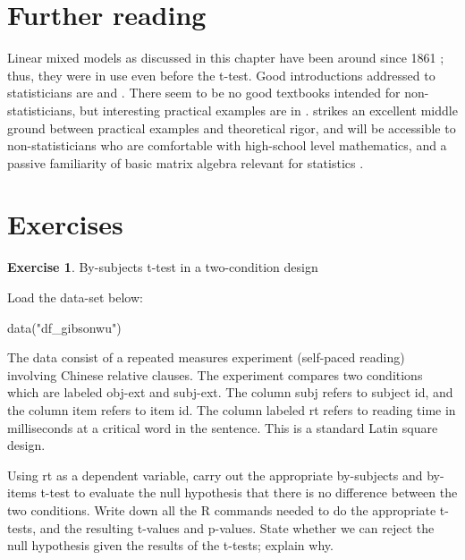 \documentclass[
  12pt,
]{krantz}
\newenvironment{Shaded}{\begin{snugshade}}{\end{snugshade}}
\newcommand{\FunctionTok}[1]{\textcolor[rgb]{0.00,0.00,0.00}{#1}}
\newcommand{\NormalTok}[1]{#1}
\newcommand{\StringTok}[1]{\textcolor[rgb]{0.31,0.60,0.02}{#1}}
\theoremstyle{definition}
\theoremstyle{definition}
\theoremstyle{definition}
\newtheorem{exercise}{Exercise}[chapter]
\theoremstyle{definition}
\theoremstyle{remark}
\begin{document}
\hypertarget{further-reading-1}{%
\section{Further reading}\label{further-reading-1}}

Linear mixed models as discussed in this chapter have been around since 1861 \citep{west2006linear}; thus, they were in use even before the t-test. Good introductions addressed to statisticians are \citet{pinheirobates} and \citet{WoodGAMMs}. There seem to be no good textbooks intended for non-statisticians, but interesting practical examples are in \citet{faraway2016extending}. \citet{west2006linear} strikes an excellent middle ground between practical examples and theoretical rigor, and will be accessible to non-statisticians who are comfortable with high-school level mathematics, and a passive familiarity of basic matrix algebra relevant for statistics \citep{fieller}.

\hypertarget{sec:LMExercises1}{%
\section{Exercises}\label{sec:LMExercises1}}

\begin{exercise}
\protect\hypertarget{exr:LMsttest}{}\label{exr:LMsttest}By-subjects t-test in a two-condition design
\end{exercise}

Load the data-set below:

\begin{Shaded}
\begin{Highlighting}[]
\FunctionTok{data}\NormalTok{(}\StringTok{"df\_gibsonwu"}\NormalTok{)}
\end{Highlighting}
\end{Shaded}

The data consist of a repeated measures experiment (self-paced reading) involving Chinese relative clauses. The experiment compares two conditions which are labeled obj-ext and subj-ext. The column subj refers to subject id, and the column item refers to item id. The column labeled rt refers to reading time in milliseconds at a critical word in the sentence. This is a standard Latin square design.

Using rt as a dependent variable, carry out the appropriate by-subjects and by-items t-test to evaluate the null hypothesis that there is no difference between the two conditions. Write down all the R commands needed to do the appropriate t-tests, and the resulting t-values and p-values. State whether we can reject the null hypothesis given the results of the t-tests; explain why.
\end{document}
